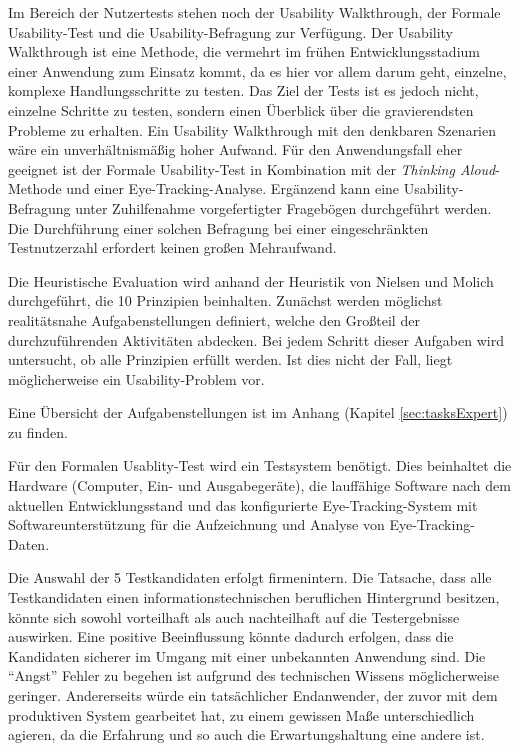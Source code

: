 Im Bereich der Nutzertests stehen noch der Usability Walkthrough, der Formale Usability-Test und die Usability-Befragung zur Verfügung. Der Usability Walkthrough ist eine Methode, die vermehrt im frühen Entwicklungsstadium einer Anwendung zum Einsatz kommt, da es hier vor allem darum geht, einzelne, komplexe Handlungsschritte zu testen. Das Ziel der Tests ist es jedoch nicht, einzelne Schritte zu testen, sondern einen Überblick über die gravierendsten Probleme zu erhalten. Ein Usability Walkthrough mit den denkbaren Szenarien wäre ein unverhältnismäßig hoher Aufwand. Für den Anwendungsfall eher geeignet ist der Formale Usability-Test in Kombination mit der \textit{Thinking Aloud}-Methode und einer Eye-Tracking-Analyse. Ergänzend kann eine Usability-Befragung unter Zuhilfenahme vorgefertigter Fragebögen durchgeführt werden. Die Durchführung einer solchen Befragung bei einer eingeschränkten Testnutzerzahl erfordert keinen großen Mehraufwand.\par
{}
Die Heuristische Evaluation wird anhand der Heuristik von Nielsen und Molich durchgeführt, die 10 Prinzipien beinhalten.\cite[S. 233]{Ullenboom2014} Zunächst werden möglichst realitätsnahe Aufgabenstellungen definiert, welche den Großteil der durchzuführenden Aktivitäten abdecken. Bei jedem Schritt dieser Aufgaben wird untersucht, ob alle Prinzipien erfüllt werden. Ist dies nicht der Fall, liegt möglicherweise ein Usability-Problem vor.\par
Eine Übersicht der Aufgabenstellungen ist im Anhang (Kapitel \ref{sec:tasksExpert}) zu finden.\par
{}
Für den Formalen Usablity-Test wird ein Testsystem benötigt. Dies beinhaltet die Hardware (Computer, Ein- und Ausgabegeräte), die lauffähige Software nach dem aktuellen Entwicklungsstand und das konfigurierte Eye-Tracking-System mit Softwareunterstützung für die Aufzeichnung und Analyse von Eye-Tracking-Daten.%
\par
Die Auswahl der 5 Testkandidaten erfolgt firmenintern. Die Tatsache, dass alle Testkandidaten einen informationstechnischen beruflichen Hintergrund besitzen, könnte sich sowohl vorteilhaft als auch nachteilhaft auf die Testergebnisse auswirken. Eine positive Beeinflussung könnte dadurch erfolgen, dass die Kandidaten sicherer im Umgang mit einer unbekannten Anwendung sind. Die \enquote{Angst} Fehler zu begehen ist aufgrund des technischen Wissens möglicherweise geringer. Andererseits würde ein tatsächlicher Endanwender, der zuvor mit dem produktiven System gearbeitet hat, zu einem gewissen Maße unterschiedlich agieren, da die Erfahrung und so auch die Erwartungshaltung eine andere ist.\par
